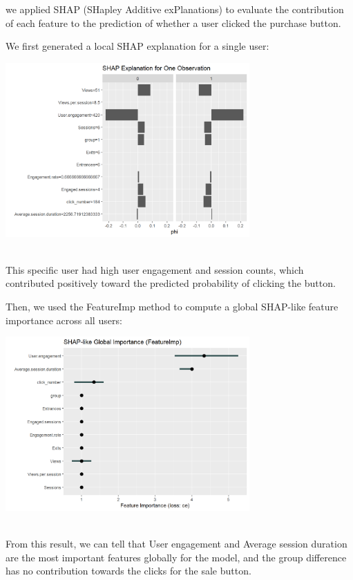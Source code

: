 \documentclass[
  letterpaper,
  DIV=11,
  numbers=noendperiod]{scrartcl}
\begin{document}
we applied SHAP (SHapley Additive exPlanations) to evaluate the
contribution of each feature to the prediction of whether a user clicked
the purchase button.

We first generated a local SHAP explanation for a single user:\\
\begin{center}
\includegraphics[width=0.7\textwidth,height=\textheight]{data_ana_pj3_files/figure-html/unnamed-chunk-10-1.png}
\end{center}
\\
This specific user had high user engagement and session counts, which
contributed positively toward the predicted probability of clicking the
button.

Then, we used the FeatureImp method to compute a global SHAP-like
feature importance across all users:\\
\begin{center}
\includegraphics[width=0.7\textwidth,height=\textheight]{data_ana_pj3_files/figure-html/unnamed-chunk-10-2.png}
\end{center}
\\
From this result, we can tell that User engagement and Average session
duration are the most important features globally for the model, and the
group difference has no contribution towards the clicks for the sale
button.\\
\end{document}
